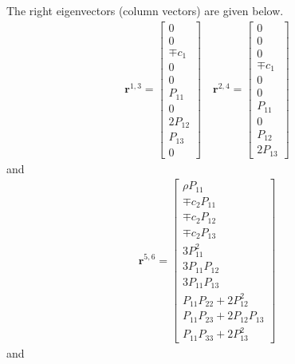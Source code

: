 \documentclass[11pt, reqno]{amsart}
\newcommand{\mvec}[1]{\mathbf{#1}}
\theoremstyle{definition}
\begin{document}
The right eigenvectors (column vectors) are given below.
\begin{align}
  \mvec{r}^{1,3}
  =
  \left[
    \begin{matrix}
      0 \\
      0 \\
      \mp c_1 \\
      0 \\
      0 \\
      P_{11} \\
      0 \\
      2P_{12} \\
      P_{13} \\
      0
    \end{matrix}
  \right]
  \quad
  \mvec{r}^{2,4}
  =
  \left[
    \begin{matrix}
      0 \\
      0 \\
      0 \\
      \mp c_1 \\
      0 \\
      0 \\
      P_{11} \\
      0 \\
      P_{12} \\
      2P_{13}
    \end{matrix}
  \right]
\end{align}
and
\begin{align}
  \mvec{r}^{5,6}
  =
  \left[
    \begin{matrix}
      \rho P_{11} \\
      \mp c_2 P_{11} \\
      \mp c_2 P_{12} \\
      \mp c_2 P_{13} \\
      3 P_{11}^2 \\
      3 P_{11}P_{12} \\
      3 P_{11}P_{13} \\
      P_{11}P_{22} + 2 P_{12}^2 \\
      P_{11}P_{23} + 2P_{12}P_{13} \\
      P_{11}P_{33} + 2P_{13}^2
    \end{matrix}
  \right]
\end{align}
and
\end{document}
